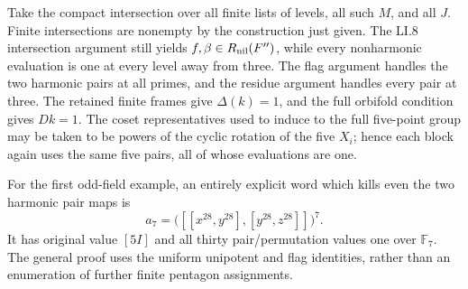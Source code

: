 Take the compact intersection over all finite lists of
levels, all such $M$, and all $J$. Finite intersections
are nonempty by the construction just given. The LI.8
intersection argument still yields
$f,\beta\in R_{\rm nil}(F'')$, while every nonharmonic
evaluation is one at every level away from three.
The flag argument handles the two harmonic pairs at all
primes, and the residue argument handles every pair at
three. The retained finite frames give $\Delta(k)=1$,
and the full orbifold condition gives $Dk=1$.
The coset representatives used to induce to the full
five-point group may be taken to be powers of the cyclic
rotation of the five $X_i$; hence each block again uses
the same five pairs, all of whose evaluations are one.

For the first odd-field example, an entirely explicit word
which kills even the two harmonic pair maps is
\[
              a_7=\bigl([[x^{28},y^{28}],
                              [y^{28},z^{28}]]\bigr)^7.
\]
It has original value $[5I]$ and all thirty pair/permutation
values one over $\mathbb F_7$. The general proof uses
the uniform unipotent and flag identities, rather than an
enumeration of further finite pentagon assignments.
